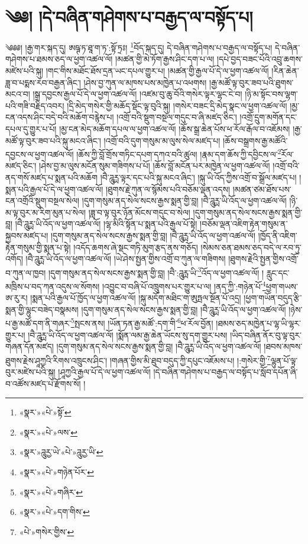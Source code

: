 \chapter{༄༅། །དེ་བཞིན་གཤེགས་པ་བརྒྱད་ལ་བསྟོད་པ།}༄༅༅། །རྒྱ་གར་སྐད་དུ། ཨཥྚ་ཏ་ཐཱ་ག་ཏ་:སྟོ་ཏྲཿ། \footnote{«སྣར་»«པེ་»སྟོ་}བོད་སྐད་དུ། དེ་བཞིན་གཤེགས་པ་བརྒྱད་ལ་བསྟོད་པ། དེ་བཞིན་གཤེགས་པ་ཐམས་ཅད་ལ་ཕྱག་འཚལ་ལོ། །མཚན་གྱི་མེ་ཏོག་རྒྱས་ཤིང་དག་པ་ལ། །དཔེ་བྱད་བཟང་པོའི་འབྲུ་ཆགས་མཛེས་པའི་སྐུ། །གང་གིས་མཐོང་ཐོས་དྲན་ཡང་དཔལ་གྱུར་པ། །མཚན་གྱི་རྒྱལ་པོ་དེ་ལ་ཕྱག་འཚལ་ལོ། །རིན་ཆེན་ཟླ་བ་པདྨས་རབ་བརྒྱན་ཞིང་། །ཤེས་བྱ་ཀུན་ལ་མཁས་པས་མཁྱེན་པ་འཕགས། །རྒྱ་མཚོ་ལྟ་བུར་ཟབ་པའི་ཐུགས་མངའ་བ། །སྒྲ་དབྱངས་རྒྱལ་པོ་དེ་ལ་ཕྱག་འཚལ་ལོ། །འཛམ་བུ་ཆུ་བོའི་གསེར་ལྟར་ལྷང་ངེ་བ། །ཉི་མ་སྟོང་བས་ལྷག་པའི་གཟི་བརྗིད་འབར། །དྲི་མེད་གསེར་གྱི་མཆོད་སྡོང་ལྟ་བུའི་སྐུ། །གསེར་བཟང་དྲི་མེད་སྣང་ལ་ཕྱག་འཚལ་ལོ། །མྱ་ངན་འདས་ཤིང་བདེ་བའི་མཆོག་བརྙེས་པ། །འགྲོ་བའི་སྡུག་བསྔལ་གདུང་བ་ཞི་མཛད་ཅིང་། །འགྲོ་དྲུག་མགོན་དང་དཔལ་དུ་གྱུར་པ་པོ། །མྱ་ངན་མེད་མཆོག་དཔལ་ལ་ཕྱག་འཚལ་ལོ། །ཆོས་སྒྲ་ཆེན་པོས་ཕ་རོལ་རྒོལ་བ་འཇོམས། །རྒྱ་མཚོ་ལྟ་བུར་ཟབ་པའི་སྐུ་མངའ་ཞིང་། །འགྲོ་བའི་དུག་གསུམ་མ་ལུས་སེལ་མཛད་པ། །ཆོས་བསྒྲགས་རྒྱ་མཚོའི་དབྱངས་ལ་ཕྱག་འཚལ་ལོ། །ཆོས་ཀྱི་བློ་གྲོས་གཏིང་དཔག་དཀའ་བའི་ཚུལ། །རྣམ་དག་ཆོས་ཀྱི་དབྱིངས་ལ་\footnote{«སྣར་»«པེ་»ལས་}རོལ་མཛད་ཅིང་། །ཤེས་བྱ་མ་ལུས་མངོན་སུམ་གཟིགས་པ་པོ། །ཆོས་བློ་མངོན་པར་མཁྱེན་ལ་ཕྱག་འཚལ་ལོ། །འགྲོ་བའི་ནད་གསོ་མཛད་པ་སྨན་པའི་མཆོག །བཻ་ཌཱུཪྻ་ལྟར་དང་པའི་སྐུ་མངའ་ཞིང་། །སྐུ་ཡི་འོད་ཀྱིས་འགྲོ་བ་སྒྲོལ་མཛད་པ། །སྨན་པའི་རྒྱལ་པོ་དེ་ལ་ཕྱག་འཚལ་ལོ། །ཐུགས་རྗེ་ཀུན་ལ་སྙོམས་པའི་བཅོམ་ལྡན་འདས། །མཚན་ཙམ་ཐོས་པས་ངན་འགྲོའི་སྡུག་བསྔལ་སེལ། །དུག་གསུམ་ནད་སེལ་སངས་རྒྱས་སྨན་གྱི་བླ། །བཻ་ཌཱུཪྻ་ཡི་འོད་ལ་ཕྱག་འཚལ་ལོ། །ཉི་མ་ལྟ་བུར་མ་རིག་མུན་པ་སེལ། །ཟླ་བ་ལྟ་བུར་ཉོན་མོངས་གདུང་བ་སེལ། །དུག་གསུམ་ནད་སེལ་སངས་རྒྱས་སྨན་གྱི་བླ། །བཻ་ཌཱུཪྻ་ཡི་འོད་ལ་ཕྱག་འཚལ་ལོ། །ལྷ་མིའི་སྟོན་པ་སྨན་པའི་རྒྱལ་པོ་སྟེ། །བཅོམ་ལྡན་འཇིག་རྟེན་གསུམ་ན་སྐྱབས་མཛད་པ། །དུག་གསུམ་ནད་སེལ་སངས་རྒྱས་སྨན་གྱི་བླ། །བཻ་ཌཱུཪྻ་ཡི་འོད་ལ་ཕྱག་འཚལ་ལོ། །ཁྱོད་ནི་འཇིག་རྟེན་གསུམ་གྱི་སྨན་པ་སྟེ། །འདོད་ཆགས་ཞེ་སྡང་གཏི་མུག་རྩད་ནས་གཅོད། །སེམས་ཅན་ཐམས་ཅད་བདེ་ལ་རབ་ཏུ་འགོད། །བཻ་ཌཱུཪྻ་ཡི་འོད་ལ་ཕྱག་འཚལ་ལོ། །ཡེ་ཤེས་སྤྱན་གྱིས་འགྲོ་བ་ཀུན་ལ་གཟིགས། །ཐུགས་རྗེའི་སྤྱན་གྱིས་འགྲོ་བ་ཀུན་ལ་ཁྱབ། །དུག་གསུམ་ནད་སེལ་སངས་རྒྱས་སྨན་གྱི་བླ། །བཻ་:ཌཱུཪྻ་ཡི་\footnote{«སྣར་»ཌཱུརྱ་ཡེ་«པེ་»ཌཱུརྱ་ཡི་}འོད་ལ་ཕྱག་འཚལ་ལོ། །
རླུང་དང་མཁྲིས་པ་བད་ཀན་འདུས་ལ་སོགས། །འབྱུང་བ་བཞི་པོ་འཁྲུགས་པར་གྱུར་པ་ལ། །ནད་ཀྱི་:གཉེན་པོ་\footnote{«སྣར་»«པེ་»གཉེན་པོར་}ཕྱག་གཡས་ཨ་རུ་ར། །སྨན་པའི་རྒྱལ་པོ་ཁྱོད་ལ་ཕྱག་འཚལ་ལོ། །སྐུ་མདོག་མཐིང་ག་ཨུཏྤལ་སྔོན་པོ་འདྲ། །ཕྱག་གཡོན་བདུད་རྩི་སྨན་གྱི་ལྷུང་བཟེད་བསྣམས། །དུག་གསུམ་ནད་སེལ་སངས་རྒྱས་སྨན་གྱི་བླ། །བཻ་ཌཱུཪྻ་ཡི་འོད་ལ་ཕྱག་འཚལ་ལོ། །ཉེས་པ་རྒྱ་མཚོ་དག་ནི་གཞར་\footnote{«སྣར་»«པེ་»གཞིར་}སྤངས་ནས། །ཡོན་ཏན་རྒྱ་མཚོ་:དག་གི་\footnote{«སྣར་»«པེ་»དག་གིས་}ཕ་རོལ་བྱོན། །ཐམས་ཅད་མཁྱེན་པ་ལྷ་ཡི་ལྷར་གྱུར་པ། །བཻ་ཌཱུཪྻ་ཡི་འོད་ལ་ཕྱག་འཚལ་ལོ། །སྨོན་ལམ་རྒྱ་ཆེན་ཡོངས་སུ་དག་གྱུར་པས། །ཡིད་བཞིན་ནོར་བུ་ལྟ་བུར་གཞན་དོན་མཛད། །དུག་གསུམ་ནད་སེལ་སངས་རྒྱས་སྨན་གྱི་བླ། །བཻ་ཌཱུཪྻ་ཡི་འོད་ལ་ཕྱག་འཚལ་ལོ། །ཐབས་མཁས་ཐུགས་རྗེས་ཤཱཀྱའི་རིགས་འཁྲུངས་ཤིང་། །གཞན་གྱིས་མི་ཐུབ་བདུད་ཀྱི་དཔུང་འཇོམས་པ། །:གསེར་གྱི་\footnote{«པེ་»གསེར་གྱིས་}ལྷུན་པོ་ལྟ་བུར་མཛེས་པའི་སྐུ། །ཤཱཀྱའི་རྒྱལ་པོ་དེ་ལ་ཕྱག་འཚལ་ལོ། །དེ་བཞིན་གཤེགས་པ་བརྒྱད་ལ་བསྟོད་པ་སློབ་དཔོན་ཞི་བ་འཚོས་མཛད་པ་རྫོགས་སོ། ། 